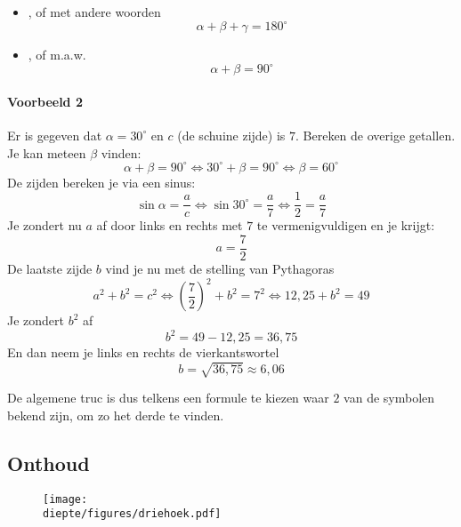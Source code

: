 \documentclass[a4paper,12pt]{article}
\newcommand{\diepte}{./}
\begin{document}
\begin{framed}
\begin{itemize}
	\item {}, of met andere woorden
	\[\alpha+\beta+\gamma=180^\circ\]
	\item {}, of m.a.w.
	\[\alpha+\beta = 90^\circ\]
\end{itemize}
\end{framed}

\paragraph{Voorbeeld 2} Er is gegeven dat $\alpha = 30^\circ$ en $c$ (de schuine zijde) is $7$. Bereken de overige getallen.\\
Je kan meteen $\beta$ vinden:
\[\alpha+\beta=90^\circ \Leftrightarrow 30^\circ + \beta = 90^\circ \Leftrightarrow \beta = 60^\circ\]
De zijden bereken je via een sinus:
\[\sin \alpha = \frac{a}{c}\Leftrightarrow \sin 30^\circ = \frac{a}{7}\Leftrightarrow \frac{1}{2}=\frac{a}{7}\]
Je zondert nu $a$ af door links en rechts met $7$ te vermenigvuldigen en je krijgt:
\[a = \frac{7}{2}\]
De laatste zijde $b$ vind je nu met de stelling van Pythagoras
\[a^2+b^2=c^2 \Leftrightarrow \left(\frac{7}{2}\right)^2+b^2=7^2 \Leftrightarrow 12,25+b^2=49\]
Je zondert $b^2$ af
\[b^2=49-12,25=36,75\]
En dan neem je links en rechts de vierkantswortel
\[b=\sqrt{36,75}\approx 6,06\]

De algemene truc is dus telkens een formule te kiezen waar $2$ van de symbolen bekend zijn, om zo het derde te vinden.

\subsection{Onthoud}
\begin{figure}[h]
\begin{center}
\texttt{[image: \\diepte/figures/driehoek.pdf]}
\end{center}
\end{figure}
\end{document}
